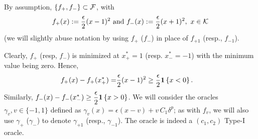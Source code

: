 
By assumption,  $\{f_+, f_-\}\subset \mathcal{F}$, with 
\begin{align*}
  f_+(x) := \dfrac{\epsilon}{2} (x - 1)^2 \text{ and } f_-(x) := \dfrac{\epsilon}{2} (x + 1)^2, \,\, x \in \mathcal{K}
\end{align*}
(we will slightly abuse notation by using $f_+$ ($f_-$) in place of $f_{+1}$ (resp., $f_{-1}$).

Clearly, $f_+$ (resp, $f_-$) is minimized at $x^*_+ = 1$ (resp. $x^*_- = -1$) with the minimum value being zero.
Hence, 
\begin{align}
  f_+(x) - f_+(x^*_+)
  = &  \dfrac{\epsilon}{2} (x - 1)^2 \ge  \dfrac{\epsilon}{2}  \mathbf{1}\left\{x  < 0\right\}. \label{eq:fv-lb}
\end{align}
Similarly,   $f_-(x) - f_-(x^*_-) \ge  \dfrac{\epsilon}{2}  \mathbf{1}\left\{x  >0\right\}$.
We will consider the oracles $\gamma_v, v\in\{-1,1\}$ defined as 
$\gamma_v(x) = \epsilon(x-v) + v\, C_1 \delta^p$; as with $f_v$, we will also use $\gamma_{+}$ ($\gamma_-$) 
to denote $\gamma_{+1}$ (resp., $\gamma_{-1}$).
The oracle is indeed a $(c_1,c_2)$ Type-I oracle.

